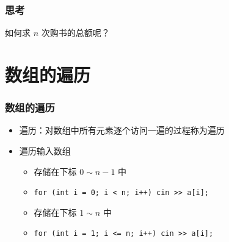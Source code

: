 \begin{frame}[fragile]
    \frametitle{思考}

    \begin{block}{}
        \vspace{.5cm}
        \begin{center}
            如何求 $n$ 次购书的总额呢？
        \end{center}
        \vspace{.5cm}
    \end{block}
\end{frame}


\section{数组的遍历}

\begin{frame}[fragile]
    \frametitle{数组的遍历}

    \begin{overlayarea}{\textwidth}{.55\textheight}
        \begin{itemize}
            \item 遍历：对数组中所有元素逐个访问一遍的过程称为遍历

            \item 遍历输入数组

                \begin{itemize}
                    \item<1-> 存储在下标 $0 \sim n - 1$ 中
                    \item<1-> \lstinline|for (int i = 0; i < n; i++) cin >> a[i];|
                    \item<2-> 存储在下标 $1 \sim n$ 中
                    \item<2-> \lstinline|for (int i = 1; i <= n; i++) cin >> a[i];|
                \end{itemize}

        \end{itemize}
    \end{overlayarea}
\end{frame}

